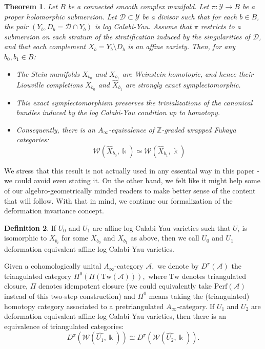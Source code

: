 \documentclass[11pt, reqno]{amsart}
\newtheorem{theorem}{Theorem}[section]
\theoremstyle{definition}
\newtheorem{definition}[theorem]{Definition}
\begin{document}
\begin{theorem}
    Let $B$ be a connected smooth complex manifold. Let $\pi: \mathcal{Y} \to B$ be a proper holomorphic submersion. Let $\mathcal{D} \subset \mathcal{Y}$ be a divisor such that for each $b \in B$, the pair $(Y_b, D_b = \mathcal{D} \cap Y_b)$ is log Calabi-Yau. Assume that $\pi$ restricts to a submersion on each stratum of the stratification induced by the singularities of $\mathcal{D}$, and that each complement $X_b = Y_b \setminus D_b$ is an affine variety. Then, for any $b_0, b_1 \in B$: \begin{itemize}
        \item  The Stein manifolds $X_{b_0}$ and $X_{b_1}$ are Weinstein homotopic, and hence their Liouville completions $\widehat{X}_{b_0}$ and $\widehat{X}_{b_1}$ are strongly exact symplectomorphic.
        \item This exact symplectomorphism preserves the trivializations of the canonical bundles induced by the log Calabi-Yau condition up to homotopy.
        \item Consequently, there is an $A_\infty$-equivalence of $\mathbb{Z}$-graded wrapped Fukaya categories:$$\mathcal{W}(\widehat{X}_{b_0},\Bbbk) \simeq \mathcal{W}(\widehat{X}_{b_1},\Bbbk)$$
    \end{itemize}
\end{theorem}

We stress that this result is not actually used in any essential way in this paper - we could avoid even stating it. On the other hand, we felt like it might help some of our algebro-geometrically minded readers to make better sense of the content that will follow. With that in mind, we continue our formalization of the deformation invariance concept.

\begin{definition} If $U_0$ and $U_1$ are affine log Calabi-Yau varieties such that $U_i$ is isomorphic to $X_{b_i}$ for some $X_{b_0}$ and $X_{b_1}$ as above, then we call $U_0$ and $U_1$ deformation equivalent affine log Calabi-Yau varieties.
\end{definition}

Given a cohomologically unital $A_\infty$-category $\mathcal{A},$ we denote by $D^\pi(\mathcal{A})$ the triangulated category $H^0(\Pi(\mathrm{Tw}(\mathcal{A}))),$ where $\mathrm{Tw}$ denotes triangulated closure, $\Pi$ denotes idempotent closure (we could equivalently take $\mathrm{Perf}(\mathcal{A})$ instead of this two-step construction) and $H^0$ means taking the (triangulated) homotopy category associated to a pretriangulated $A_\infty$-category. If $U_1$ and $U_2$ are deformation equivalent affine log Calabi-Yau varieties, then there is an equivalence of triangulated categories: 
\[ D^\pi(\mathcal{W}(\widehat{U_1},\Bbbk)) \cong D^\pi(\mathcal{W}(\widehat{U_2},\Bbbk)). \]
\end{document}
